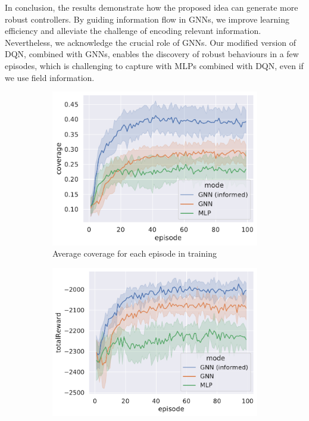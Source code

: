 In conclusion, the results demonstrate how the proposed idea can generate more robust controllers. 
 By guiding information flow in \acp{GNN}, 
 we improve learning efficiency and alleviate the challenge of encoding relevant information. 
%
Nevertheless, we acknowledge the crucial role of \acp{GNN}. 
 Our modified version of DQN, combined with \acp{GNN}, 
 enables the discovery of robust behaviours in a few episodes, 
 which is challenging to capture with \acp{MLP} combined with \ac{DQN}, even if we use field information.
\begin{figure}
  \centering
  \hfill
  \begin{subfigure}[b]{0.45\linewidth}
    \includegraphics[width=\linewidth]{papers/acsos2023/imgs/coverage-in-time}
    \caption{Average coverage for each episode in training }
    \label{acsos2023:fig:coverage}
  \end{subfigure}%
  \begin{subfigure}[b]{0.5\linewidth}
    \includegraphics[width=\linewidth]{papers/acsos2023/imgs/reward-in-time}

\end{subfigure}
\end{figure}
